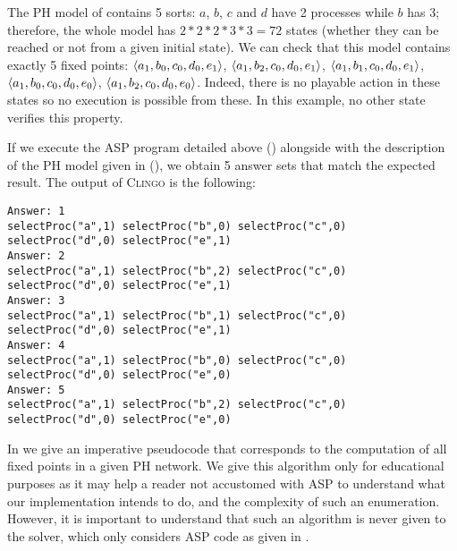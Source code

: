 \begin{example}
The PH model of  contains 5 sorts:
$a$, $b$, $c$ and $d$ have 2 processes while $b$ has 3; therefore, the whole model has $2*2*2*3*3 = 72$ states (whether they can be reached or not from a given initial state).
We can check that this model contains exactly 5 fixed points: $\mbox{$\langle a_1, b_0, c_0, d_0, e_1 \rangle$}$, $\mbox{$\langle a_1, b_2, c_0, d_0, e_1 \rangle$}$, $\mbox{$\langle a_1, b_1, c_0, d_0, e_1 \rangle$}$, $\mbox{$\langle a_1, b_0, c_0, d_0, e_0 \rangle$}$, $\mbox{$\langle a_1, b_2, c_0, d_0, e_0 \rangle$}$.
Indeed, there is no playable action in these states so no execution is possible from these. In this example, no other state verifies this property.

If we execute the ASP program detailed above ()
alongside with the description of the PH model given in  (),
we obtain 5 answer sets that match the expected result.
The output of \textsc{Clingo} is the following:
\addtocounter{lstnumber}{-15}
\begin{lstlisting}[numbers=none]
Answer: 1
selectProc("a",1) selectProc("b",0) selectProc("c",0)
selectProc("d",0) selectProc("e",1)
Answer: 2
selectProc("a",1) selectProc("b",2) selectProc("c",0)
selectProc("d",0) selectProc("e",1)
Answer: 3
selectProc("a",1) selectProc("b",1) selectProc("c",0)
selectProc("d",0) selectProc("e",1)
Answer: 4
selectProc("a",1) selectProc("b",0) selectProc("c",0)
selectProc("d",0) selectProc("e",0)
Answer: 5
selectProc("a",1) selectProc("b",2) selectProc("c",0)
selectProc("d",0) selectProc("e",0)
\end{lstlisting}
\end{example}

In  we give an imperative pseudocode
that corresponds to the computation of
all fixed points in a given PH network.
We give this algorithm only for educational purposes
as it may help a reader not accustomed with ASP to understand
what our implementation intends to do,
and the complexity of such an enumeration.
However, it is important to understand that
such an algorithm is never given to the solver,
which only considers ASP code as given in .

